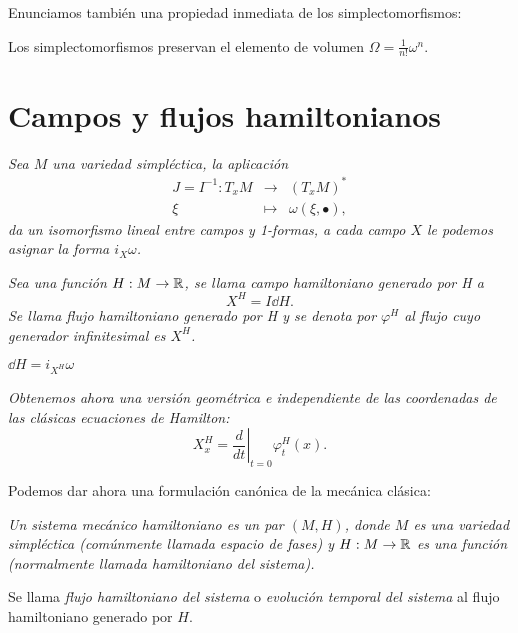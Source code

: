Enunciamos también una propiedad inmediata de los simplectomorfismos:
\begin{prop}\label{volumen}
  Los simplectomorfismos preservan el elemento de volumen $\Omega=\frac{1}{n!}\omega^n$.
\end{prop}

\section{Campos y flujos hamiltonianos}\label{sec:hamilton}
\begin{obs}
  \em
  Sea $M$ una variedad simpléctica, la aplicación 
  \begin{equation*}
    \begin{array}{rcl}
      J=I^{-1}: T_xM & \longrightarrow & (T_xM)^* \\
      \xi & \longmapsto & \omega(\xi,\bullet),
      \end{array} 
  \end{equation*}
da un isomorfismo lineal entre campos y 1-formas, a cada campo $X$ le podemos asignar la forma $i_X \omega$.
\end{obs}
\begin{defn}
  \em
  Sea una función $H:M \rightarrow \mathbb{R}$, se llama \emph{campo hamiltoniano generado por H} a 
  \begin{equation*}
    X^H=I \dd H.
  \end{equation*}
  Se llama \emph{flujo hamiltoniano generado por H} y se denota por $\varphi^H$ al flujo cuyo generador infinitesimal es $X^H$.
\end{defn}
\begin{obs}
  \em
  $\dd H = i_{X^H}\omega$
\end{obs}
\begin{obs}
  \em
  Obtenemos ahora una versión geométrica e independiente de las coordenadas de las clásicas ecuaciones de Hamilton:
  \begin{equation*}
    X^H_x= \left.\frac{d}{dt}\right| _{t=0}\varphi^H_t(x).
  \end{equation*}
\end{obs}
Podemos dar ahora una formulación canónica de la mecánica clásica:
\begin{defn}
  \em
  Un \emph{sistema mecánico hamiltoniano} es un par $(M,H)$, donde $M$ es una variedad simpléctica (comúnmente llamada \emph{espacio de fases}) y $H:M \rightarrow \mathbb{R}$ es una función (normalmente llamada \emph{hamiltoniano} del sistema).

  Se llama \emph{flujo hamiltoniano del sistema} o \emph{evolución temporal del sistema} al flujo hamiltoniano generado por $H$.
\end{defn}

